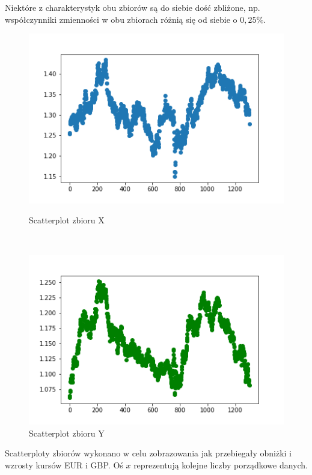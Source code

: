 \documentclass[12pt]{mwart}
\begin{document}
Niektóre z charakterystyk obu zbiorów są do siebie dość zbliżone, np. współczynniki zmienności w obu zbiorach różnią się od siebie o $0,25\%$. 
	\begin{figure}[H]
		\begin{minipage}{.5\linewidth}
			\centering
			\includegraphics[scale=0.7]{X_sc.PNG}
			\caption{Scatterplot zbioru X}
		\end{minipage}
		$\quad$
		\begin{minipage}{.5\linewidth}
			\centering
			\includegraphics[scale=0.7]{Y_sc.PNG}
			\caption{Scatterplot zbioru Y}
		\end{minipage}
	\end{figure}
\noindent Scatterploty zbiorów wykonano w celu zobrazowania jak przebiegały obniżki i wzrosty kursów EUR i GBP. Oś $x$ reprezentują kolejne liczby porządkowe danych. 
\end{document}
